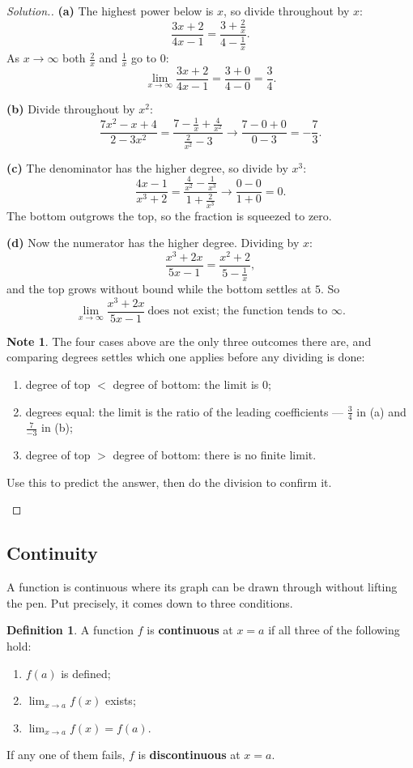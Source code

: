 \documentclass[11pt,a4paper]{article}
\theoremstyle{definition}
\newtheorem{definition}[thm]{Definition}
\newtheorem{note}[thm]{Note}
\newenvironment{solution}
  {\renewcommand{\qedsymbol}{}\begin{proof}[\textit{Solution}.]}
  {\end{proof}}
\begin{document}
\begin{solution}
\textbf{(a)} The highest power below is $x$, so divide throughout by $x$:
$$\frac{3x+2}{4x-1}=\frac{3+\frac{2}{x}}{4-\frac{1}{x}}.$$
As $x\to\infty$ both $\frac{2}{x}$ and $\frac{1}{x}$ go to $0$:
$$\lim_{x\to\infty}\frac{3x+2}{4x-1}=\frac{3+0}{4-0}=\frac{3}{4}.$$

\textbf{(b)} Divide throughout by $x^2$:
$$\frac{7x^2-x+4}{2-3x^2}=\frac{7-\frac{1}{x}+\frac{4}{x^2}}{\frac{2}{x^2}-3}
\longrightarrow\frac{7-0+0}{0-3}=-\frac{7}{3}.$$

\textbf{(c)} The denominator has the higher degree, so divide by $x^3$:
$$\frac{4x-1}{x^3+2}=\frac{\frac{4}{x^2}-\frac{1}{x^3}}{1+\frac{2}{x^3}}
\longrightarrow\frac{0-0}{1+0}=0.$$
The bottom outgrows the top, so the fraction is squeezed to zero.

\textbf{(d)} Now the numerator has the higher degree. Dividing by $x$:
$$\frac{x^3+2x}{5x-1}=\frac{x^2+2}{5-\frac{1}{x}},$$
and the top grows without bound while the bottom settles at $5$. So
$$\lim_{x\to\infty}\frac{x^3+2x}{5x-1}\ \text{does not exist; the function tends to }
\infty.$$

\begin{note}
The four cases above are the only three outcomes there are, and comparing degrees
settles which one applies before any dividing is done:
\begin{enumerate}
\item[(i).] degree of top $<$ degree of bottom: the limit is $0$;
\item[(ii).] degrees equal: the limit is the ratio of the leading coefficients ---
$\frac{3}{4}$ in (a) and $\frac{7}{-3}$ in (b);
\item[(iii).] degree of top $>$ degree of bottom: there is no finite limit.
\end{enumerate}
Use this to predict the answer, then do the division to confirm it.
\end{note}
\end{solution}

\subsection{Continuity}

A function is continuous where its graph can be drawn through without lifting the pen.
Put precisely, it comes down to three conditions.

\begin{definition}
A function $f$ is \textbf{continuous} at $x=a$ if all three of the following hold:
\begin{enumerate}
\item[(i).] $f(a)$ is defined;
\item[(ii).] $\lim_{x\to a}f(x)$ exists;
\item[(iii).] $\lim_{x\to a}f(x)=f(a)$.
\end{enumerate}
If any one of them fails, $f$ is \textbf{discontinuous} at $x=a$.
\end{definition}
\end{document}

